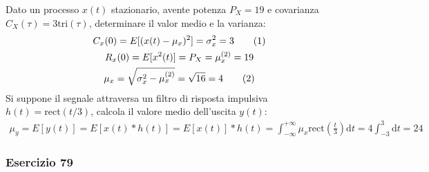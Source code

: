 \documentclass{article}
\newcommand{\rect}{\mathrm{rect}}
\newcommand{\tri}{\mathrm{tri}}
\newcommand{\df}{\mathrm{d}}
\newcommand{\tageq}{\tag{\stepcounter{equation}\theequation}}
\begin{document}
Dato un processo $x(t)$ stazionario, avente potenza $P_X=19$ e covarianza $C_X(\tau)=3\tri(\tau)$, determinare il valor medio e la varianza: 
\begin{gather*}
    C_x(0)=E[(x(t)-\mu_x)^2]=\sigma_x^2=3\tageq\\
    R_x(0)=E[x^2(t)]=P_X=\mu_x^{(2)}=19\\
    \mu_x=\sqrt{\sigma_x^2-\mu_x^{(2)}}=\sqrt{16}=4\tageq
\end{gather*}
Si suppone il segnale attraversa un filtro di risposta impulsiva $h(t)=\rect(t/3)$, calcola il valore medio dell'uscita $y(t)$:
\begin{gather}
    \mu_y=E[y(t)]=E[x(t)*h(t)]=E[x(t)]*h(t)=\displaystyle\int_{-\infty}^{+\infty}\mu_x\rect\left(\frac{t}{3}\right)\df t=4\int_{-3}^3\df t=24
\end{gather}

\subsubsection*{Esercizio 79}
\end{document}
